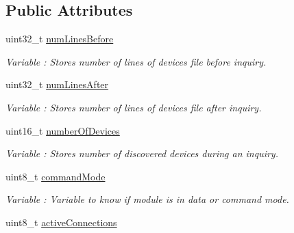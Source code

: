 \subsection*{Public Attributes}
\begin{DoxyCompactItemize}
\item 
uint32\+\_\+t \hyperlink{class_wasp_b_t___pro_a3c4b8c279a897e5ab380d047425e2322}{num\+Lines\+Before}\hypertarget{class_wasp_b_t___pro_a3c4b8c279a897e5ab380d047425e2322}{}\label{class_wasp_b_t___pro_a3c4b8c279a897e5ab380d047425e2322}

\begin{DoxyCompactList}\small\item\em Variable \+: Stores number of lines of devices file before inquiry. \end{DoxyCompactList}\item 
uint32\+\_\+t \hyperlink{class_wasp_b_t___pro_a6f64d90b33f4f9c76d7603754546b80a}{num\+Lines\+After}\hypertarget{class_wasp_b_t___pro_a6f64d90b33f4f9c76d7603754546b80a}{}\label{class_wasp_b_t___pro_a6f64d90b33f4f9c76d7603754546b80a}

\begin{DoxyCompactList}\small\item\em Variable \+: Stores number of lines of devices file after inquiry. \end{DoxyCompactList}\item 
uint16\+\_\+t \hyperlink{class_wasp_b_t___pro_addc4d326f53efb1f07918482924935e8}{number\+Of\+Devices}\hypertarget{class_wasp_b_t___pro_addc4d326f53efb1f07918482924935e8}{}\label{class_wasp_b_t___pro_addc4d326f53efb1f07918482924935e8}

\begin{DoxyCompactList}\small\item\em Variable \+: Stores number of discovered devices during an inquiry. \end{DoxyCompactList}\item 
uint8\+\_\+t \hyperlink{class_wasp_b_t___pro_a460f1975ea6ae8fcfe79a845bc973563}{command\+Mode}
\begin{DoxyCompactList}\small\item\em Variable \+: Variable to know if module is in data or command mode. \end{DoxyCompactList}\item 
uint8\+\_\+t \hyperlink{class_wasp_b_t___pro_a56d671babb13f0944c66de5e5b331819}{active\+Connections}\hypertarget{class_wasp_b_t___pro_a56d671babb13f0944c66de5e5b331819}{}\label{class_wasp_b_t___pro_a56d671babb13f0944c66de5e5b331819}


\end{DoxyCompactItemize}

